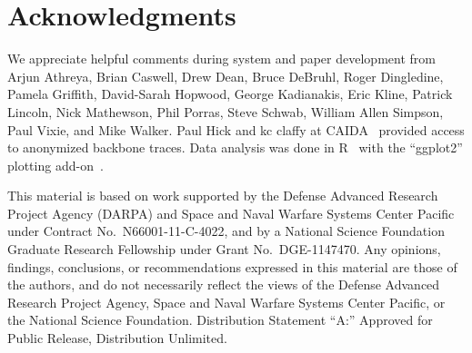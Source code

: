 \section{Acknowledgments}

We appreciate helpful comments during system and paper development
from Arjun Athreya, Brian Caswell, Drew Dean, Bruce DeBruhl,
Roger Dingledine, Pamela Griffith, David-Sarah Hopwood,
George Kadianakis, Eric Kline, Patrick Lincoln, Nick Mathewson,
Phil Porras, Steve Schwab, William Allen Simpson, Paul Vixie,
and Mike Walker.
Paul Hick and kc claffy at CAIDA~\cite{d-caida} provided access to
anonymized backbone traces.  Data analysis was done in R~\cite{s-r}
with the “ggplot2” plotting add-on~\cite{s-ggplot2}.

This material is based on work supported by the Defense Advanced
Research Project Agency (DARPA) and Space and Naval Warfare Systems
Center Pacific under Contract No.\ N66001-11-C-4022, and by a National
Science Foundation Graduate Research Fellowship under Grant
No.\ DGE-1147470.  Any opinions, findings, conclusions, or
recommendations expressed in this material are those of the authors,
and do not necessarily reflect the views of the Defense Advanced
Research Project Agency, Space and Naval Warfare Systems Center
Pacific, or the National Science Foundation.  Distribution Statement
“A:” Approved for Public Release, Distribution Unlimited.
